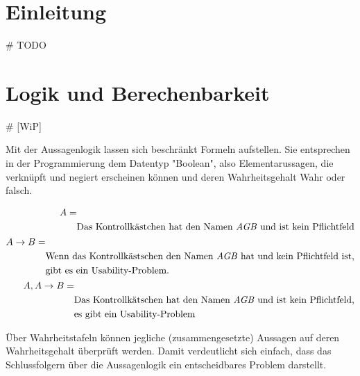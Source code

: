 \documentclass[runningheads,a4paper]{llncs}
\begin{document}
\section{Einleitung}
\# TODO
\newpage
\section{Logik und Berechenbarkeit}

\# [WiP]

Mit der Aussagenlogik lassen sich beschränkt Formeln aufstellen. Sie entsprechen in der Programmierung dem Datentyp "Boolean", also Elementarussagen, die verknüpft und negiert erscheinen können und deren Wahrheitsgehalt Wahr oder falsch.

\begin{align}
\begin{split}
A = & \\
& \textnormal{Das Kontrollkästchen hat den Namen \textit{AGB} und ist kein Pflichtfeld}
\end{split}\\
\begin{split}
A \to B = & \\
& \textnormal{Wenn das Kontrollkästschen den Namen \textit{AGB} hat und kein Pflichtfeld ist,} \\
& \textnormal{gibt es ein Usability-Problem.}
\end{split}\\
\begin{split}
A, A \to B = & \\
& \textnormal{Das Kontrollkätschen hat den Namen \textit{AGB} und ist kein Pflichtfeld,} \\
& \textnormal{es gibt ein Usability-Problem}
\end{split}
\end{align}

 



Über Wahrheitstafeln können jegliche (zusammengesetzte) Aussagen auf deren Wahrheitsgehalt überprüft werden. Damit verdeutlicht sich einfach, dass das Schlussfolgern über die Aussagenlogik ein entscheidbares Problem darstellt.
\end{document}
